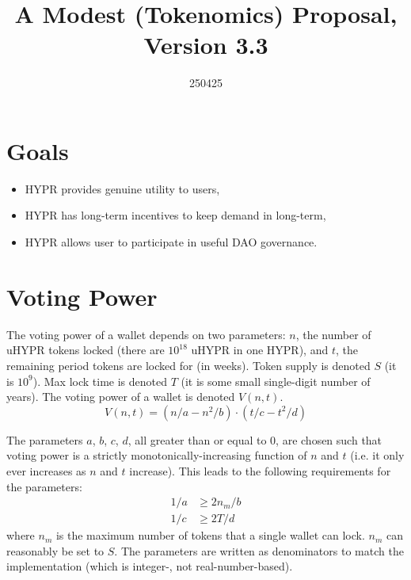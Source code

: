 \documentclass{article}
\title{A Modest (Tokenomics) Proposal, Version 3.3}
\date{250425}
\author{}
\begin{document}
\maketitle

\section{Goals}\label{sec:goals}
\begin{itemize}
    \item HYPR provides genuine utility to users,
    \item HYPR has long-term incentives to keep demand in long-term,
    \item HYPR allows user to participate in useful DAO governance.
\end{itemize}

\section{Voting Power}\label{sec:votingpower}

The voting power of a wallet depends on two parameters: $n$, the number of uHYPR tokens locked (there are $10^{18}$ uHYPR in one HYPR), and $t$, the remaining period tokens are locked for (in weeks).
Token supply is denoted $S$ (it is $10^9$).
Max lock time is denoted $T$ (it is some small single-digit number of years).
The voting power of a wallet is denoted $V(n, t)$.
\begin{equation}
V(n, t) = (n/a - n^2/b) \cdot (t/c - t^2/d)
\end{equation}

The parameters $a$, $b$, $c$, $d$, all greater than or equal to $0$, are chosen such that voting power is a strictly monotonically-increasing function of $n$ and $t$ (i.e. it only ever increases as $n$ and $t$ increase).
This leads to the following requirements for the parameters:
\begin{equation}\label{eq:parameters-extremum}
\begin{aligned}
1/a &\geq 2 n_m / b\\
1/c &\geq 2 T / d
\end{aligned}
\end{equation}
where $n_m$ is the maximum number of tokens that a single wallet can lock.
$n_m$ can reasonably be set to $S$.
The parameters are written as denominators to match the implementation (which is integer-, not real-number-based).
\end{document}
